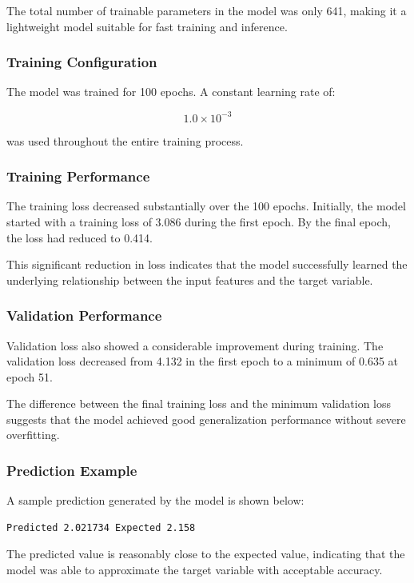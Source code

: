 \documentclass{ieeeaccess}
\begin{document}
The total number of trainable parameters in the model was only 641, making it a lightweight model suitable for fast training and inference.

\subsubsection{Training Configuration}

The model was trained for 100 epochs. A constant learning rate of:

\[
1.0 \times 10^{-3}
\]

was used throughout the entire training process.

\subsubsection{Training Performance}

The training loss decreased substantially over the 100 epochs. Initially, the model started with a training loss of 3.086 during the first epoch. By the final epoch, the loss had reduced to 0.414.

This significant reduction in loss indicates that the model successfully learned the underlying relationship between the input features and the target variable.

\subsubsection{Validation Performance}

Validation loss also showed a considerable improvement during training. The validation loss decreased from 4.132 in the first epoch to a minimum of 0.635 at epoch 51.

The difference between the final training loss and the minimum validation loss suggests that the model achieved good generalization performance without severe overfitting.



\subsubsection{Prediction Example}

A sample prediction generated by the model is shown below:

\begin{lstlisting}
Predicted 2.021734 Expected 2.158
\end{lstlisting}

The predicted value is reasonably close to the expected value, indicating that the model was able to approximate the target variable with acceptable accuracy.
\end{document}
